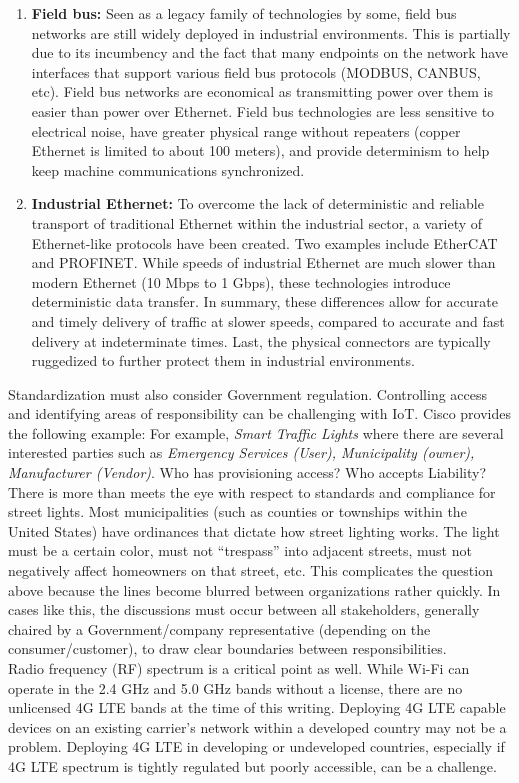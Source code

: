 \begin{enumerate}
  \item	\textbf{Field bus:} Seen as a legacy family of technologies by some,
  field bus networks are still widely deployed in industrial environments.
  This is partially due to its incumbency and the fact that many endpoints on
  the network have interfaces that support various field bus protocols
  (MODBUS, CANBUS, etc). Field bus networks are economical as transmitting
  power over them is easier than power over Ethernet. Field bus technologies
  are less sensitive to electrical noise, have greater physical range without
  repeaters (copper Ethernet is limited to about 100 meters), and provide
  determinism to help keep machine communications synchronized.
  \item	\textbf{Industrial Ethernet:} To overcome the lack of deterministic
  and reliable transport of traditional Ethernet within the industrial sector,
  a variety of Ethernet-like protocols have been created. Two examples include
  EtherCAT and PROFINET. While speeds of industrial Ethernet are much slower
  than modern Ethernet (10 Mbps to 1 Gbps), these technologies introduce
  deterministic data transfer. In summary, these differences allow for
  accurate and timely delivery of traffic at slower speeds, compared to
  accurate and fast delivery at indeterminate times. Last, the physical
  connectors are typically ruggedized to further protect them in industrial
  environments.
\end{enumerate}

Standardization must also consider Government regulation. Controlling access
and identifying areas of responsibility can be challenging with IoT. Cisco
provides the following example:  For example, \textit{Smart Traffic Lights}
where there are several interested parties such as \textit{Emergency Services
(User), Municipality (owner), Manufacturer (Vendor)}. Who has provisioning
access? Who accepts Liability? \\

There is more than meets the eye with respect to standards and compliance for
street lights. Most municipalities (such as counties or townships within the
United States) have ordinances that dictate how street lighting works. The
light must be a certain color, must not ``trespass'' into adjacent streets,
must not negatively affect homeowners on that street, etc. This complicates
the question above because the lines become blurred between organizations
rather quickly. In cases like this, the discussions must occur between all
stakeholders, generally chaired by a Government/company representative
(depending on the consumer/customer), to draw clear boundaries between
responsibilities. \\

Radio frequency (RF) spectrum is a critical point as well. While Wi-Fi can
operate in the 2.4 GHz and 5.0 GHz bands without a license, there are no
unlicensed 4G LTE bands at the time of this writing. Deploying 4G LTE capable
devices on an existing carrier’s network within a developed country may not be
a problem. Deploying 4G LTE in developing or undeveloped countries, especially
if 4G LTE spectrum is tightly regulated but poorly accessible, can be a challenge.
